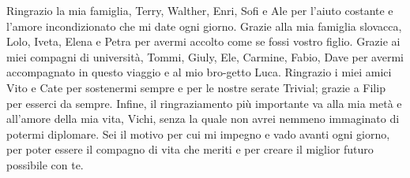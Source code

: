 \documentclass[12pt,a4paper,openright,twoside]{book}
\begin{document}
\listoffigures
\lstlistoflistings

\backmatter





\begin{acknowledgements} %
Ringrazio la mia famiglia, Terry, Walther, Enri, Sofi e Ale per l'aiuto costante e l'amore incondizionato che mi date ogni giorno.
Grazie alla mia famiglia slovacca, Lolo, Iveta, Elena e Petra per avermi accolto come se fossi vostro figlio.
Grazie ai miei compagni di università, Tommi, Giuly, Ele, Carmine, Fabio, Dave per avermi accompagnato in questo viaggio e al mio bro-getto Luca.
Ringrazio i miei amici Vito e Cate per sostenermi sempre e per le nostre serate Trivial; grazie a Filip per esserci da sempre.
Infine, il ringraziamento più importante va alla mia metà e all'amore della mia vita, Vichi, senza la quale non avrei nemmeno immaginato di potermi diplomare. Sei il motivo per cui mi impegno e vado avanti ogni giorno, per poter essere il compagno di vita che meriti e per creare il miglior futuro possibile con te.
\end{acknowledgements}
\end{document}
